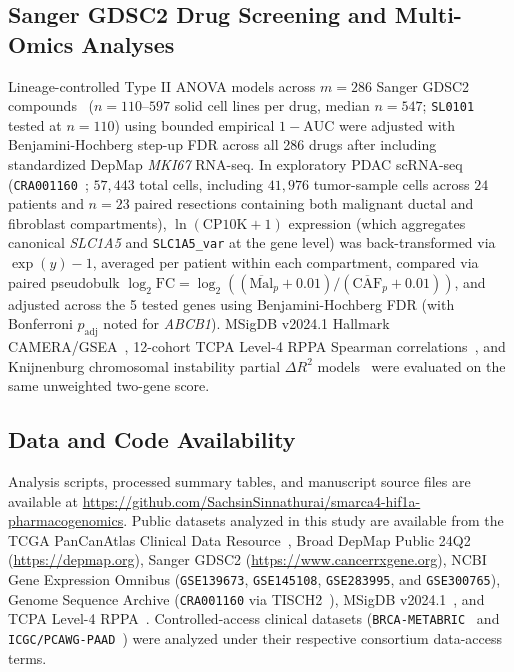 \documentclass[11pt]{article}
\begin{document}
\subsection{Sanger GDSC2 Drug Screening and Multi-Omics Analyses}
Lineage-controlled Type II ANOVA models across $m = 286$ Sanger GDSC2 compounds~\cite{iorio2016} ($n = 110\text{--}597$ solid cell lines per drug, median $n = 547$; \texttt{SL0101} tested at $n = 110$) using bounded empirical $1 - \text{AUC}$ were adjusted with Benjamini-Hochberg step-up FDR across all 286 drugs after including standardized DepMap \textit{MKI67} RNA-seq. In exploratory PDAC scRNA-seq (\texttt{CRA001160}~\cite{peng2019,han2023}; $57,443$ total cells, including $41,976$ tumor-sample cells across $24$ patients and $n = 23$ paired resections containing both malignant ductal and fibroblast compartments), $\ln(\text{CP10K}+1)$ expression (which aggregates canonical \textit{SLC1A5} and \texttt{SLC1A5\_var} at the gene level) was back-transformed via $\exp(y) - 1$, averaged per patient within each compartment, compared via paired pseudobulk $\log_2\text{FC} = \log_2((\overline{\text{Mal}}_p + 0.01) / (\overline{\text{CAF}}_p + 0.01))$, and adjusted across the 5 tested genes using Benjamini-Hochberg FDR (with Bonferroni $p_{\text{adj}}$ noted for \textit{ABCB1}). MSigDB v2024.1 Hallmark CAMERA/GSEA~\cite{liberzon2015,wu2012}, 12-cohort TCPA Level-4 RPPA Spearman correlations~\cite{li2013}, and Knijnenburg chromosomal instability partial $\Delta R^2$ models~\cite{knijnenburg2018} were evaluated on the same unweighted two-gene score.

\subsection*{Data and Code Availability}
Analysis scripts, processed summary tables, and manuscript source files are available at \url{https://github.com/SachsinSinnathurai/smarca4-hif1a-pharmacogenomics}. Public datasets analyzed in this study are available from the TCGA PanCanAtlas Clinical Data Resource~\cite{tcga2018}, Broad DepMap Public 24Q2 (\url{https://depmap.org}), Sanger GDSC2 (\url{https://www.cancerrxgene.org}), NCBI Gene Expression Omnibus (\texttt{GSE139673}, \texttt{GSE145108}, \texttt{GSE283995}, and \texttt{GSE300765}), Genome Sequence Archive (\texttt{CRA001160} via TISCH2~\cite{han2023}), MSigDB v2024.1~\cite{liberzon2015}, and TCPA Level-4 RPPA~\cite{li2013}. Controlled-access clinical datasets (\texttt{BRCA-METABRIC}~\cite{curtis2012} and \texttt{ICGC/PCAWG-PAAD}~\cite{pcawg2020}) were analyzed under their respective consortium data-access terms.
\end{document}

